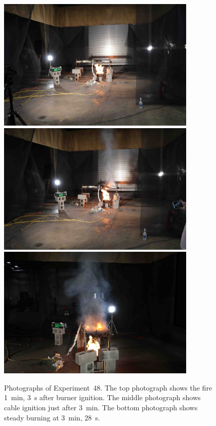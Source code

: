 \begin{figure}[p]
\centering
\includegraphics[height=2.50in]{../FIGURES/Test_48_1_min_3_s} \\
\includegraphics[height=2.50in]{../FIGURES/Test_48_3_min_11_s} \\
\includegraphics[height=2.50in]{../FIGURES/Test_48_3_min_28_s}
\caption[Photographs of Experiment~48]{Photographs of Experiment~48. The top photograph shows the fire 1~min, 3~s after burner ignition. The middle photograph shows cable ignition just after 3~min. The bottom photograph shows steady burning at 3~min, 28~s.}
\label{fig:Test_48_photos}
\end{figure}


\clearpage

